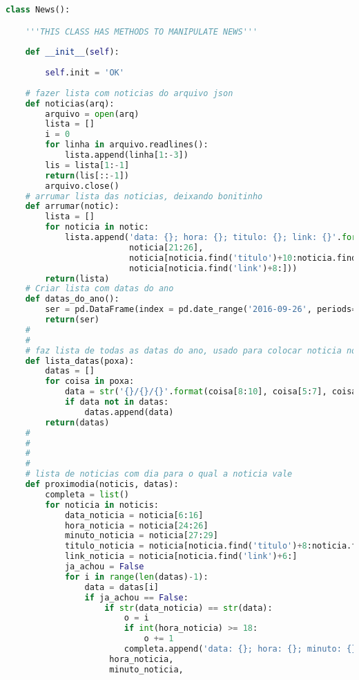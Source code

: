 \begin{lstlisting}[language=Python]



class News():

    '''THIS CLASS HAS METHODS TO MANIPULATE NEWS'''
    
    def __init__(self):
        
        self.init = 'OK'
    
    # fazer lista com noticias do arquivo json
    def noticias(arq):
        arquivo = open(arq)
        lista = []
        i = 0
        for linha in arquivo.readlines():
            lista.append(linha[1:-3])
        lis = lista[1:-1]
        return(lis[::-1])
        arquivo.close()
    # arrumar lista das noticias, deixando bonitinho
    def arrumar(notic):
        lista = []
        for noticia in notic:
            lista.append('data: {}; hora: {}; titulo: {}; link: {}'.format(noticia[10:20],
                         noticia[21:26],
                         noticia[noticia.find('titulo')+10:noticia.find('link')-4],
                         noticia[noticia.find('link')+8:]))
        return(lista)
    # Criar lista com datas do ano
    def datas_do_ano():
        ser = pd.DataFrame(index = pd.date_range('2016-09-26', periods=964))
        return(ser)
    #
    #
    # faz lista de todas as datas do ano, usado para colocar noticia no dia seguinte
    def lista_datas(poxa):
        datas = []
        for coisa in poxa:
            data = str('{}/{}/{}'.format(coisa[8:10], coisa[5:7], coisa[:4]))
            if data not in datas:
                datas.append(data)
        return(datas)
    #
    #
    #
    #
    # lista de noticias com dia para o qual a noticia vale
    def proximodia(noticis, datas):
        completa = list()
        for noticia in noticis:
            data_noticia = noticia[6:16]
            hora_noticia = noticia[24:26]
            minuto_noticia = noticia[27:29]
            titulo_noticia = noticia[noticia.find('titulo')+8:noticia.find('link')-2]
            link_noticia = noticia[noticia.find('link')+6:]
            ja_achou = False
            for i in range(len(datas)-1):
                data = datas[i]
                if ja_achou == False:
                    if str(data_noticia) == str(data):
                        o = i
                        if int(hora_noticia) >= 18:
                            o += 1
                        completa.append('data: {}; hora: {}; minuto: {}; dia: {}; titulo: {}; link: {}'.format(data_noticia,
                     hora_noticia,
                     minuto_noticia,

\end{lstlisting}
